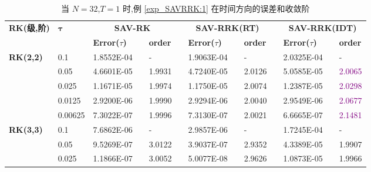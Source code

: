 \documentclass[aspectratio=169]{beamer}
\numberwithin{theorem}{section} %
\numberwithin{equation}{section}%
\numberwithin{figure}{section}%
\numberwithin{table}{section}%
\begin{document}
\begin{frame}%

	\begin{table}[H]\scriptsize
		\centering
		\caption{当 $N=32$,$T = 1$ 时,例 \ref{exp_SAVRRK:1} 在时间方向的误差和收敛阶}
		\begin{tabular}{lllllrlrlrlrlrl}
		\toprule
		\multicolumn{2}{l}{\multirow{2}[3]{*}{\textbf{RK(级,阶)}}} & \multicolumn{2}{l}{\multirow{2}[3]{*}{$\bm{\tau}$}} & \multicolumn{3}{c}{\textbf{SAV-RK}} &       & \multicolumn{3}{c}{\textbf{SAV-RRK(RT)}} &       & \multicolumn{3}{c}{\textbf{SAV-RRK(IDT)}} \\
		\cmidrule{5-7}\cmidrule{9-11}\cmidrule{13-15}    \multicolumn{2}{l}{} & \multicolumn{2}{l}{} & \textbf{Error($\tau$)} &       & \textbf{order} &       & \textbf{Error($\tau$)} &       & \textbf{order} &       & \textbf{Error($\tau$)} &       & \textbf{order} \\
		\hline
		\multicolumn{2}{l}{\multirow{5}[0]{*}{\textbf{RK(2,2)}}} & \multicolumn{2}{l}{0.1} & 1.8552E-04 &       & -     &       & 1.9063E-04 &       & -     &       & 2.0325E-04 &       & - \\
		\multicolumn{2}{l}{} & \multicolumn{2}{l}{0.05} & 4.6601E-05 &       & 1.9931  &       & 4.7240E-05 &       & 2.0126  &       & 5.0585E-05 &       & \textcolor{purple}{2.0065}  \\
		\multicolumn{2}{l}{} & \multicolumn{2}{l}{0.025} & 1.1671E-05 &       & 1.9974  &       & 1.1750E-05 &       & 2.0074  &       & 1.2387E-05 &       & \textcolor{purple}{2.0298}  \\
		\multicolumn{2}{l}{} & \multicolumn{2}{l}{0.0125} & 2.9200E-06 &       & 1.9990  &       & 2.9294E-06 &       & 2.0040  &       & 2.9549E-06 &       & \textcolor{purple}{2.0677}  \\
		\multicolumn{2}{l}{} & \multicolumn{2}{l}{0.00625} & 7.3022E-07 &       & 1.9996  &       & 7.3130E-07 &       & 2.0021  &       & 6.6665E-07 &       & \textcolor{purple}{2.1481}  \\
		\multicolumn{2}{l}{\multirow{5}[0]{*}{\textbf{RK(3,3)}}} & \multicolumn{2}{l}{0.1} & 7.6862E-06 &       & -     &       & 2.9857E-06 &       & -     &       & 1.7245E-04 &       & - \\
		\multicolumn{2}{l}{} & \multicolumn{2}{l}{0.05} & 9.5269E-07 &       & 3.0122  &       & 3.9037E-07 &       & 2.9352  &       & 4.3389E-05 &       & 1.9907  \\
		\multicolumn{2}{l}{} & \multicolumn{2}{l}{0.025} & 1.1866E-07 &       & 3.0052  &       & 5.0077E-08 &       & 2.9626  &       & 1.0873E-05 &       & 1.9966  \\

\end{tabular}
\end{table}
\end{frame}
\end{document}
